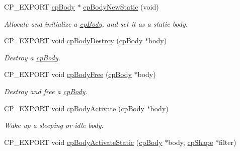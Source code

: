 \begin{DoxyCompactItemize}
\mbox{\label{group__cpBody_gad3140a8f543bf33cfa923aebe84c51c0}} 
C\+P\+\_\+\+E\+X\+P\+O\+RT \hyperlink{structcpBody}{cp\+Body} $\ast$ \hyperlink{group__cpBody_gad3140a8f543bf33cfa923aebe84c51c0}{cp\+Body\+New\+Static} (void)
\begin{DoxyCompactList}\small\item\em Allocate and initialize a \hyperlink{structcpBody}{cp\+Body}, and set it as a static body. \end{DoxyCompactList}\item 
\mbox{\label{group__cpBody_gad1c5b4732223132e2e6f2cd25adea056}} 
C\+P\+\_\+\+E\+X\+P\+O\+RT void \hyperlink{group__cpBody_gad1c5b4732223132e2e6f2cd25adea056}{cp\+Body\+Destroy} (\hyperlink{structcpBody}{cp\+Body} $\ast$body)
\begin{DoxyCompactList}\small\item\em Destroy a \hyperlink{structcpBody}{cp\+Body}. \end{DoxyCompactList}\item 
\mbox{\label{group__cpBody_gac7189e8502b0583a6bd6633b450fad0d}} 
C\+P\+\_\+\+E\+X\+P\+O\+RT void \hyperlink{group__cpBody_gac7189e8502b0583a6bd6633b450fad0d}{cp\+Body\+Free} (\hyperlink{structcpBody}{cp\+Body} $\ast$body)
\begin{DoxyCompactList}\small\item\em Destroy and free a \hyperlink{structcpBody}{cp\+Body}. \end{DoxyCompactList}\item 
\mbox{\label{group__cpBody_ga23741f9682e268913d9f6f8a72b64cf0}} 
C\+P\+\_\+\+E\+X\+P\+O\+RT void \hyperlink{group__cpBody_ga23741f9682e268913d9f6f8a72b64cf0}{cp\+Body\+Activate} (\hyperlink{structcpBody}{cp\+Body} $\ast$body)
\begin{DoxyCompactList}\small\item\em Wake up a sleeping or idle body. \end{DoxyCompactList}\item 
\mbox{\label{group__cpBody_gabf84834a51b76230ecc83f90890559eb}} 
C\+P\+\_\+\+E\+X\+P\+O\+RT void \hyperlink{group__cpBody_gabf84834a51b76230ecc83f90890559eb}{cp\+Body\+Activate\+Static} (\hyperlink{structcpBody}{cp\+Body} $\ast$body, \hyperlink{structcpShape}{cp\+Shape} $\ast$filter)

\end{DoxyCompactItemize}
